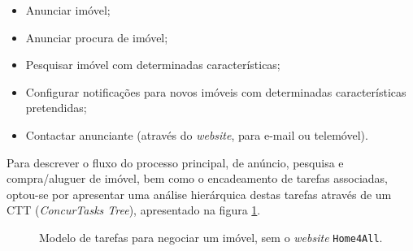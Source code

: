 \begin{itemize}
    \item Anunciar imóvel;
    \item Anunciar procura de imóvel;
    \item Pesquisar imóvel com determinadas características;
    \item Configurar notificações para novos imóveis com determinadas características pretendidas;
    \item Contactar anunciante (através do \textit{website}, para e-mail ou telemóvel).
\end{itemize}

Para descrever o fluxo do processo principal, de anúncio, pesquisa e compra/aluguer de imóvel, bem como o encadeamento de tarefas associadas, optou-se por apresentar uma análise hierárquica destas tarefas através de um CTT (\textit{ConcurTasks Tree}), apresentado na figura \ref{fig:modelo_tarefas_antes}.

\begin{figure}[H]
    \centering

    \vspace{0.4cm}
    
    
    \vspace{0.1cm}
    

    \caption{Modelo de tarefas para negociar um imóvel, sem o \textit{website} \texttt{Home4All}.}
    \label{fig:modelo_tarefas_antes}
\end{figure}


